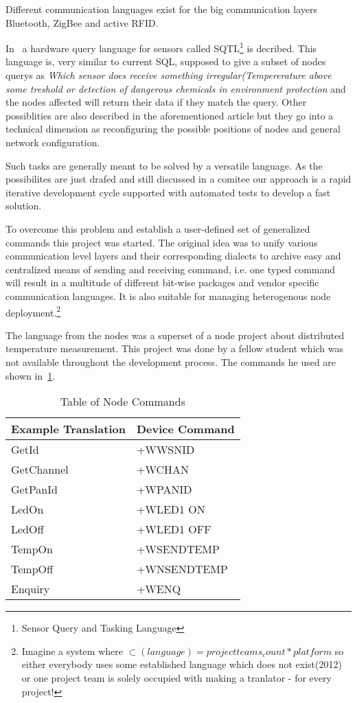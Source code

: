 Different communication languages exist for the big communication layers Bluetooth, ZigBee and active RFID.

In~\cite[p. 407]{Akyildiz02wirelesssensor} a hardware query language for sensors called \textsc{SQTL}\footnote{Sensor Query and Tasking Language}
is decribed. This language is, very similar to current \textsc{SQL}, supposed to give a subset of nodes querys as \textit{Which sensor does receive
something irregular(Tempererature above some treshold or detection of dangerous chemicals in environment protection} and the nodes affected 
will return their data if they match the query. Other possiblities are also described in the aforementioned article but they go into a technical
dimension as reconfiguring the possible positions of nodes and general network configuration.

Such tasks are generally meant to be solved by a versatile language. As the possibilites are just drafed and still discussed in a comitee our 
approach is a rapid iterative development cycle supported with automated tests to develop a fast solution.

To overcome this problem and establish a user-defined set of generalized commands this project was started.
The original idea was to unify various communication level layers and their corresponding dialects to 
archive easy and centralized means of sending and receiving command, i.e. one typed command will result in 
a multitude of different bit-wise packages and vendor specific communication languages.
It is also suitable for managing heterogenous node deployment.\footnote{Imagine a system where \(\subset(language)=project teams_count * platform \) 
so either everybody uses some established language which does not exist(2012) or one project team is solely occupied with 
making a tranlator - for every project!}

The language from the nodes was a superset of a node project about distributed temperature measurement. This project was done by 
a fellow student which was not available throughout the development process. The commands he used are shown in~\ref{tab:nodecommands}.

\begin{table}[!h] 
\centering 
\begin{tabular}{|l||l|} 
Example Translation & Device Command \\ 
\hline
GetId & +WWSNID \\
GetChannel & +WCHAN \\
GetPanId & +WPANID \\
LedOn & +WLED1 ON \\
LedOff & +WLED1 OFF \\
TempOn & +WSENDTEMP \\
TempOff & +WNSENDTEMP \\
Enquiry & +WENQ \\
\end{tabular} 
\caption{ Table of Node Commands} 
\label{tab:nodecommands} 
\end{table}

